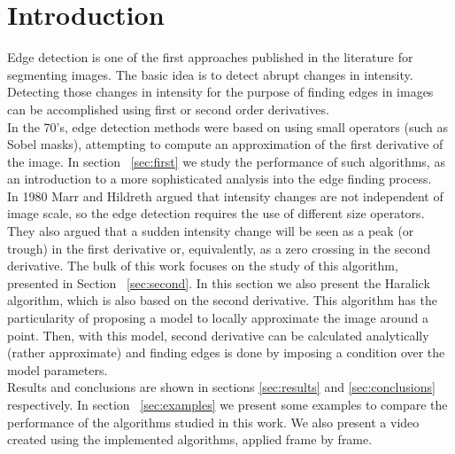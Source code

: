 \documentclass{ipol}
\numberwithin{equation}{section}
\numberwithin{table}{section}
\numberwithin{figure}{section}
\begin{document}

\section{Introduction}
\label{sec:intro}

Edge detection is one of the first approaches published in the literature for 
segmenting images. The basic idea is to detect abrupt changes in intensity. 
Detecting those changes in intensity for the purpose of finding edges in images 
can be accomplished using first or second order derivatives. \\

In the 70's, edge detection methods were based on using small operators 
(such as Sobel masks), attempting to compute an approximation of the
first derivative of the image. In section ~\ref{sec:first} we study the 
performance of such algorithms, as an introduction to a more sophisticated 
analysis into the edge finding process.\\

In 1980 Marr and Hildreth argued that intensity changes are not independent 
of image scale, so the edge detection requires the use of different size 
operators. They also argued that a sudden intensity change will be seen 
as a peak (or trough) in the first derivative or, equivalently, as a zero 
crossing in the second derivative. The bulk of this work focuses on the 
study of this algorithm, presented in Section ~\ref{sec:second}. In this section 
we also present the Haralick algorithm, which is also based on the second derivative.
This algorithm has the particularity of proposing a model to locally approximate 
the image around a point. Then, with this model, second derivative can be calculated 
analytically (rather approximate) and finding edges is done by imposing a 
condition over the model parameters. \\

Results and conclusions are shown in sections \ref{sec:results} and 
\ref{sec:conclusions} respectively. In section ~\ref{sec:examples} we present some examples to compare the 
performance of the algorithms studied in this work. We also present a 
video created using the implemented algorithms, applied frame by frame.\\
\end{document}
